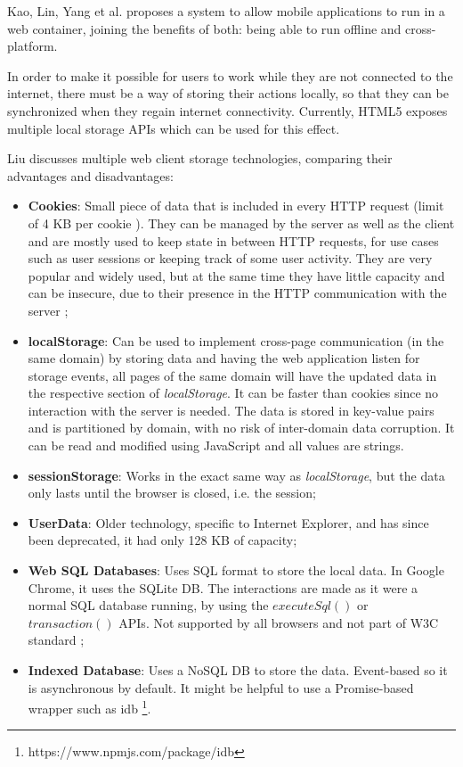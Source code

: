 Kao, Lin, Yang et al. \cite{Kao2012} proposes a system to allow mobile applications to run in a web container, joining the benefits of both: being able to run offline and cross-platform.

In order to make it possible for users to work while they are not connected to the internet, there must be a way of storing their actions locally, so that they can be synchronized when they regain internet connectivity. Currently, HTML5 exposes multiple local storage APIs which can be used for this effect.

Liu \cite{Liu2014} discusses multiple web client storage technologies, comparing their advantages and disadvantages:
\begin{itemize}
    \item \textbf{Cookies}: Small piece of data that is included in every HTTP request (limit of 4 KB per cookie \cite{cookies-rfc}). They can be managed by the server as well as the client and are mostly used to keep state in between HTTP requests, for use cases such as user sessions or keeping track of some user activity. They are very popular and widely used, but at the same time they have little capacity and can be insecure, due to their presence in the HTTP communication with the server \cite{Velagapudi2019} \cite{Kwon2020};
    \item \textbf{localStorage}: Can be used to implement cross-page communication (in the same domain) by storing data and having the web application listen for storage events, all pages of the same domain will have the updated data in the respective section of \textit{localStorage}. It can be faster than cookies since no interaction with the server is needed.
    The data is stored in key-value pairs and is partitioned by domain, with no risk of inter-domain data corruption. It can be read and modified using JavaScript and all values are strings.
    \item \textbf{sessionStorage}: Works in the exact same way as \textit{localStorage}, but the data only lasts until the browser is closed, i.e. the session;
    \item \textbf{UserData}: Older technology, specific to Internet Explorer, and has since been deprecated, it had only 128 KB of capacity;
    \item \textbf{Web SQL Databases}: Uses SQL format to store the local data. In Google Chrome, it uses the SQLite DB. The interactions are made as it were a normal SQL database running, by using the $executeSql()$ or $transaction()$ APIs. Not supported by all browsers and not part of W3C standard \cite{WebSQL-storage-w3c};
    \item \textbf{Indexed Database}: Uses a NoSQL DB to store the data. Event-based so it is asynchronous by default. It might be helpful to use a Promise-based wrapper \cite{promises-js-mdn} such as idb \footnote{https://www.npmjs.com/package/idb}.
\end{itemize}
